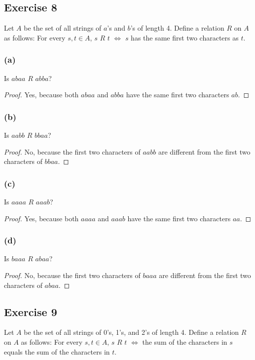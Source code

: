 \documentclass[14pt]{extarticle}
\begin{document}
\subsection{Exercise 8}
Let $A$ be the set of all strings of $a$’s and $b$’s of length 4. Define a relation $R$ on $A$ as follows: For
every \(s, t \in A\), $s$ $R$ $t$ $\iff$ $s$ has the same first two characters as $t$.

\subsubsection{(a)}
Is $abaa$ $R$ $abba$?

\begin{proof}
        Yes, because both $abaa$ and $abba$ have the same first two characters $ab$.
\end{proof}

\subsubsection{(b)}
Is $aabb$ $R$ $bbaa$?

\begin{proof}
        No, because the first two characters of $aabb$ are different from the first two characters of $bbaa$.
\end{proof}

\subsubsection{(c)}
Is $aaaa$ $R$ $aaab$?

\begin{proof}
        Yes, because both $aaaa$ and $aaab$ have the same first two characters $aa$.
\end{proof}

\subsubsection{(d)}
Is $baaa$ $R$ $abaa$?

\begin{proof}
        No, because the first two characters of $baaa$ are different from the first two characters of $abaa$.
\end{proof}

\subsection{Exercise 9}
Let $A$ be the set of all strings of 0’s, 1’s, and 2’s of length 4. Define a relation $R$ on $A$ as follows: For
every \(s, t \in A\), $s$ $R$ $t$ $\iff$ the sum of the characters in $s$ equals the sum of the characters in $t$.
\end{document}
